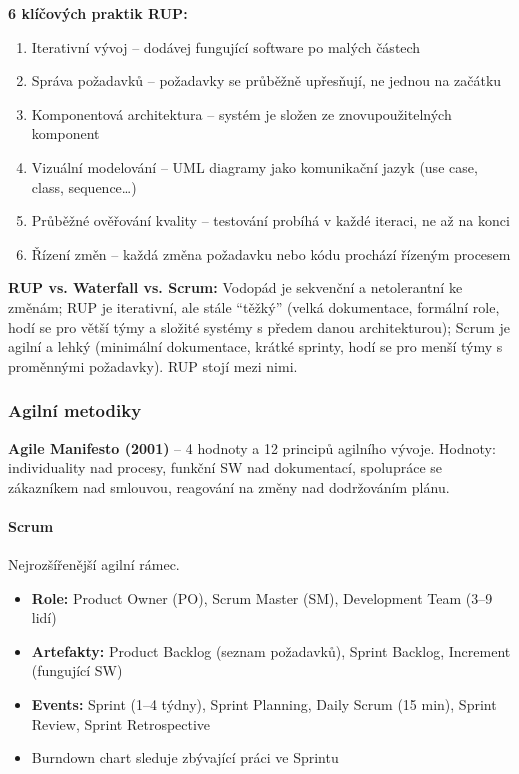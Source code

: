 \textbf{6 klíčových praktik RUP:}
\begin{enumerate}
  \item Iterativní vývoj -- dodávej fungující software po malých částech
  \item Správa požadavků -- požadavky se průběžně upřesňují, ne jednou na začátku
  \item Komponentová architektura -- systém je složen ze znovupoužitelných komponent
  \item Vizuální modelování -- UML diagramy jako komunikační jazyk (use case, class, sequence\ldots)
  \item Průběžné ověřování kvality -- testování probíhá v každé iteraci, ne až na konci
  \item Řízení změn -- každá změna požadavku nebo kódu prochází řízeným procesem
\end{enumerate}

\textbf{RUP vs. Waterfall vs. Scrum:}
Vodopád je sekvenční a netolerantní ke změnám; RUP je iterativní, ale stále ``těžký'' (velká dokumentace,
formální role, hodí se pro větší týmy a složité systémy s předem danou architekturou);
Scrum je agilní a lehký (minimální dokumentace, krátké sprinty, hodí se pro menší týmy
s proměnnými požadavky). RUP stojí mezi nimi.

\subsubsection{Agilní metodiky}

\textbf{Agile Manifesto (2001)} -- 4 hodnoty a 12 principů agilního vývoje.
Hodnoty: individuality nad procesy, funkční SW nad dokumentací, spolupráce se zákazníkem nad smlouvou, reagování na změny nad dodržováním plánu.

\paragraph{Scrum}
Nejrozšířenější agilní rámec.
\begin{itemize}
  \item \textbf{Role:} Product Owner (PO), Scrum Master (SM), Development Team (3--9 lidí)
  \item \textbf{Artefakty:} Product Backlog (seznam požadavků), Sprint Backlog, Increment (fungující SW)
  \item \textbf{Events:} Sprint (1--4 týdny), Sprint Planning, Daily Scrum (15 min), Sprint Review, Sprint Retrospective
  \item Burndown chart sleduje zbývající práci ve Sprintu
\end{itemize}

